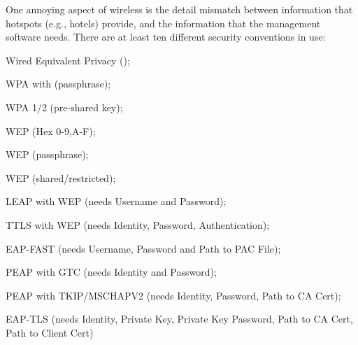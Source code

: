 \documentclass[12pt,twoside]{article}
\begin{document}
One annoying aspect of wireless is the detail mismatch between
information that hotspots (e.g., hotels) provide, and the information
that the management software needs.
There are at least ten different security conventions in use:
\begin{enumerate*}
\item Wired Equivalent Privacy ();
\item WPA with (passphrase);
\item WPA 1/2 (pre-shared key);
\item WEP (Hex 0-9,A-F);
\item WEP (passphrase);
\item WEP (shared/restricted);
\item LEAP with WEP (needs Username and Password); 
\item TTLS with WEP (needs Identity, Password, Authentication);
\item EAP-FAST (needs Username, Password and Path to PAC File);
\item PEAP with GTC (needs Identity and Password);
\item PEAP with TKIP/MSCHAPV2 (needs Identity, Password, Path to CA Cert);
\item EAP-TLS (needs Identity, Private Key, Private Key Password, Path to CA
  Cert, Path to Client Cert)
\end{enumerate*}
\end{document}
